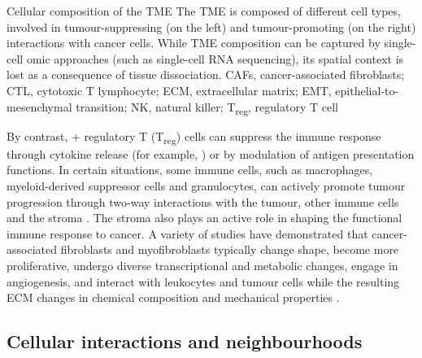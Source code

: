     {Cellular composition of the \acf{TME} \parencite{Seferbekova2023-wg}}
    {The TME is composed of different cell types, involved in tumour-suppressing (on the left) and tumour-promoting (on the right) interactions with cancer cells. While TME composition can be captured by single-cell omic approaches (such as single-cell RNA sequencing), its spatial context is lost as a consequence of tissue dissociation. CAFs, cancer-associated fibroblasts; CTL, cytotoxic T lymphocyte; ECM, extracellular matrix; EMT, epithelial-to-mesenchymal transition; NK, natural killer; T\textsubscript{reg}, regulatory T cell}

By contrast, + regulatory T (T\textsubscript{reg}) cells can suppress the immune response through cytokine release (for example, ) or by modulation of antigen presentation functions. In certain situations, some immune cells, such as macrophages, myeloid-derived suppressor cells and granulocytes, can actively promote tumour progression through two-way interactions with the tumour, other immune cells and the stroma \parencite{Goswami2023-qv,Murdoch2008-cu,DeNardo2019-tk}. The stroma also plays an active role in shaping the functional immune response to cancer. A variety of studies have demonstrated that cancer-associated fibroblasts and myofibroblasts typically change shape, become more proliferative, undergo diverse transcriptional and metabolic changes, engage in angiogenesis, and interact with leukocytes and tumour cells while the resulting \ac{ECM} changes in chemical composition and mechanical properties \parencite{Valkenburg2018-kn,Kalluri2016-xz,Lendahl2022-sx,Sahai2020-ok,Davidson2020-rc}.

\subsection*{Cellular interactions and neighbourhoods}

